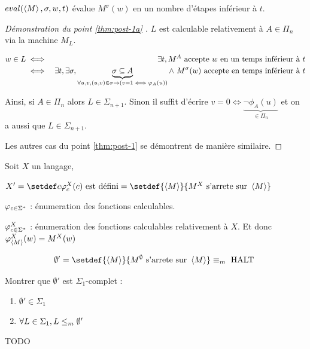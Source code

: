 \begin{definition}
	$eval(\left\langle M\right\rangle, \sigma,w,t)$ évalue $M^{\sigma}(w)$ en un nombre d'étapes inférieur à $t$.
\end{definition}

\begin{proof}[Démonstration du point \ref{thm:post-1a} \bimpRL]

	$L$ est calculable relativement à $A \in \Pi_n$ via la machine $M_L$.

	\begin{eqnarray*}
		w \in L &\iff& \exists t, M^A \text{ accepte } w \text{ en un temps inférieur à } t\\
		&\iff& \exists t, \exists \sigma,
		\underbrace{\sigma \subseteq A}_{\forall u,v, (u,v) \in \sigma \rightarrow (v=1 \iff \varphi_A(u))}
		\land\  M^{\sigma} (w) \text{ accepte en temps inférieur à }t
	\end{eqnarray*}

	Ainsi, si $A \in \Pi_n$ alors $L \in \Sigma_{n+1}$. Sinon il suffit d'écrire
	$v = 0 \iff \underbrace{\lnot \phi_A(u)}_{\in \Pi_n}$ et on a aussi que $L \in \Sigma_{n+1}$.

	Les autres cas du point \ref{thm:post-1} se démontrent de manière similaire.
\end{proof}

\begin{definition}
	Soit $X$ un langage,

	$X' = \setdef c {\phi_c^X(c) \text{ est défini}} = \setdef {\encode M} {M^X \text{ s'arrete sur } \encode M}$

	$\varphi_{c \in \Sigma^{*}}$ : énumeration des fonctions calculables.

	$\varphi_{c \in \Sigma^{*}}^X$ : énumeration des fonctions calculables relativement à $X$. Et donc $\varphi_{\left\langle M\right\rangle}^X(w) = M^X(w)$
\end{definition}


\begin{exemple}
	$$\emptyset' = \setdef {\encode M} {M^{\emptyset} \text{ s'arrete sur } \encode M} \equivm \halt$$
\end{exemple}

\begin{exercice}
	Montrer que $\emptyset '$ est $\Sigma_1$-complet :
	\begin{enumerate}
		\item $\emptyset' \in \Sigma_1$
		\item $\forall L \in \Sigma_1, L \leq_m \emptyset'$
	\end{enumerate}
\end{exercice}

TODO
